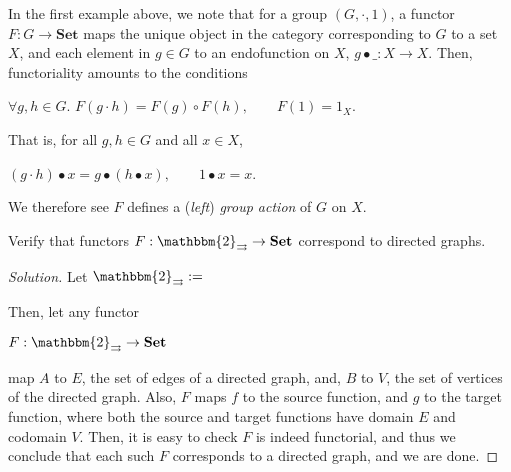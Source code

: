 \documentclass[]{amsbook}
\newcommand{\qq}{\qquad}
\newcommand{\catname}[1]{\mathbf{#1}}
\newcommand{\0}{\mathbf{0}}
\newcommand{\1}{\mathbf{1}}
\newenvironment{solution}
    {\begin{proof}[Solution]}{\end{proof}}
\begin{document}
In the first example above, we note that for a group $(G, \cdot, 1)$, a functor
$F: G \to \catname{Set}$ maps the unique object in the category corresponding
to $G$ to a set $X$, and each element in $g \in G$ to an endofunction on $X$,
$g \bullet \_ : X \to X$. Then, functoriality amounts to the
conditions
\begin{center}
    $\forall g, h \in G. \,\, F(g \cdot h) = F(g) \circ F(h), \qq F(1) = 1_X$.
\end{center}
That is, for all $g, h \in G$ and all $x \in X$,
\begin{center}
    $(g \cdot h) \bullet x = g \bullet (h \bullet x), \qq 1 \bullet x = x$.
\end{center}
We therefore see $F$ defines a (\emph{left}) \emph{group action} of $G$ on $X$.

\setcounter{Exercise}{44}
\begin{Exercise}
Verify that functors $F: \mathbbm{2}_{\rightrightarrows} \to \catname{Set}$
correspond to directed graphs.
\end{Exercise}
\begin{solution}
Let $\mathbbm{2}_{\rightrightarrows} := $
Then, let any functor
\begin{center}
    $F: \mathbbm{2}_{\rightrightarrows} \to \catname{Set}$
\end{center}
map $A$ to $E$, the set of edges of a directed graph, and, $B$ to $V$, the set
of vertices of the directed graph. Also, $F$ maps $f$ to the source function,
and $g$ to the target function, where both the source and target functions
have domain $E$ and codomain $V$. Then, it is easy to check $F$ is indeed
functorial, and thus we conclude that each such $F$ corresponds to a directed
graph, and we are done.
\end{solution}
\end{document}
